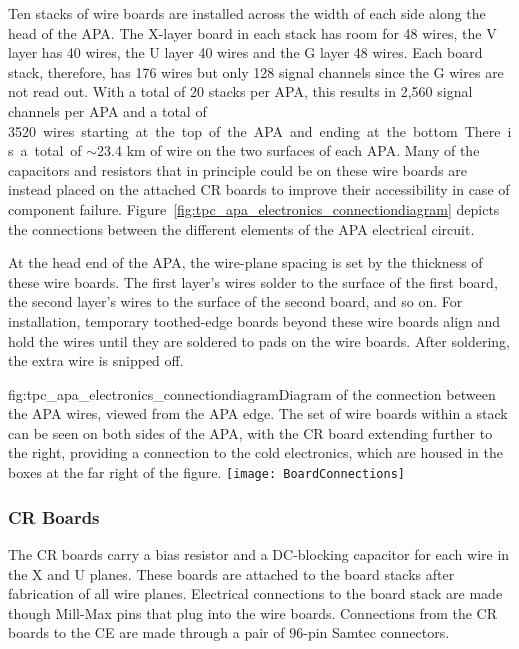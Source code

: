 Ten stacks of wire boards are installed across the width of each side along the head of the APA.  The X-layer board in each stack has room for 48 wires, the V layer has 40 wires, the U layer 40 wires and the G layer 48 wires.  Each board stack, therefore, has 176 wires but only 128 signal channels since the G wires are not read out.  
With a total of 20 stacks per APA, this results in 2,560 signal channels per APA and a total of \SI{3520} wires starting at the top of the APA and ending at the bottom.  There is a total of $\sim$23.4 km of wire on the two surfaces of each APA.  Many of the capacitors and resistors that in principle could be on these wire boards are instead
placed on the attached CR boards to improve their accessibility in case of component failure.   Figure~\ref{fig:tpc_apa_electronics_connectiondiagram} depicts the connections between the different elements of the APA electrical circuit. 

At the head end of the APA, the wire-plane spacing is set by the thickness of these wire boards.  The first layer's wires solder to the surface of the first board, the second layer's wires to the surface of the second board, and so on.  For installation, temporary toothed-edge boards beyond these wire boards align and hold the wires until they are soldered to pads on the wire boards.  After soldering, the extra wire is snipped off. 

\begin{dunefigure}{fig:tpc_apa_electronics_connectiondiagram}{Diagram of the connection between the APA wires, viewed from the APA edge. The set of wire boards within a stack can be seen on both sides of the APA, with the CR board extending further to the right, providing a connection to the cold electronics, which are housed in the boxes at the far right of the figure. }
\texttt{[image: BoardConnections]}
\end{dunefigure}

\subsubsection{CR Boards}
\label{sec:crboards}

The CR boards carry a bias resistor and a DC-blocking capacitor for each wire in the X and U planes. These boards are attached to the board stacks after fabrication of all wire planes.  Electrical connections to the board stack are made though Mill-Max pins that plug into the wire boards. Connections from the CR boards to the CE are made through a pair of 96-pin Samtec connectors.


